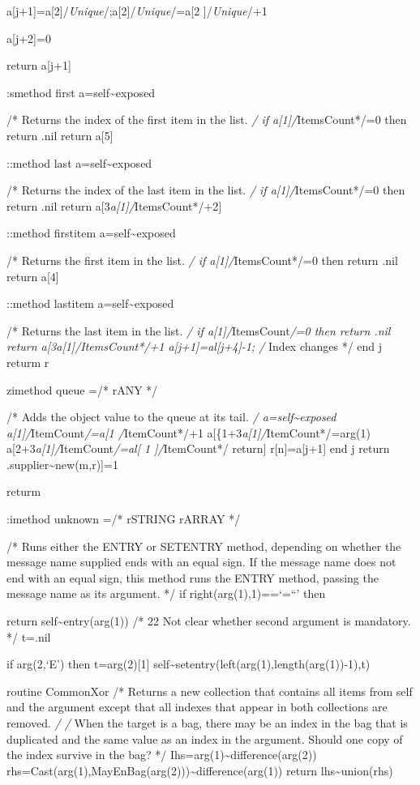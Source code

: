 a{[}j+1{]}=a{[}2{]}/\emph{Unique}/;a{[}2{]}/\emph{Unique}/=a{[}2
{]}/\emph{Unique}/+1

a{[}j+2{]}=0

return a{[}j+1{]}

:smethod first a=self\textasciitilde exposed

/* Returns the index of the first item in the list. \emph{/ if
a{[}1{]}/}ItemsCount*/=0 then return .nil return a{[}5{]}

::method last a=self\textasciitilde exposed

/* Returns the index of the last item in the list. \emph{/ if
a{[}1{]}/}ItemsCount*/=0 then return .nil return
a{[}3\emph{a{[}1{]}/}ItemsCount*/+2{]}\textbar{}

::method firstitem a=self\textasciitilde exposed

/* Returns the first item in the list. \emph{/ if
a{[}1{]}/}ItemsCount*/=0 then return .nil return a{[}4{]}

::method lastitem a=self\textasciitilde exposed

/* Returns the last item in the list. \emph{/ if
a{[}1{]}/}ItemsCount\emph{/=0 then return .nil return
a{[}3\emph{a{[}1{]}/}ItemsCount*/+1 \textbar{]}
a{[}j+1{]}=al{[}j+4{]}-1; /} Index changes */ end j returm r

zimethod queue =/* rANY */

/* Adds the object value to the queue at its tail. \emph{/
a=self\textasciitilde exposed a{[}1{]}/}ItemCount\emph{/=a{[}1
\textbar/}ItemCount*/+1
a{[}\{1+3\emph{a{[}1{]}/}ItemCount*/\textbar=arg(1)
a{[}2+3\emph{a{[}1{]}/}ItemCount\emph{/\textbar=al{[} 1 {]}/}ItemCount*/
return{]} r{[}n{]}=a{[}j+1{]} end j return
.supplier\textasciitilde new(m,r){]}=1

returm

:imethod unknown =/* rSTRING rARRAY */

/* Runs either the ENTRY or SETENTRY method, depending on whether the
message name supplied ends with an equal sign. If the message name does
not end with an equal sign, this method runs the ENTRY method, passing
the message name as its argument. */ if right(arg(1),1)==`=``' then

return self\textasciitilde entry(arg(1)) /* 22 Not clear whether second
argument is mandatory. */ t=.nil

if arg(2,`E') then t=arg(2){[}1{]}
self\textasciitilde setentry(left(arg(1),length(arg(1))-1),t)

routine CommonXor /* Returns a new collection that contains all items
from self and the argument except that all indexes that appear in both
collections are removed. \emph{/ /} When the target is a bag, there may
be an index in the bag that is duplicated and the same value as an index
in the argument. Should one copy of the index survive in the bag? */
Ihs=arg(1)\textasciitilde difference(arg(2))
rhs=Cast(arg(1),MayEnBag(arg(2)))\textasciitilde difference(arg(1))
return lhs\textasciitilde union(rhs)

